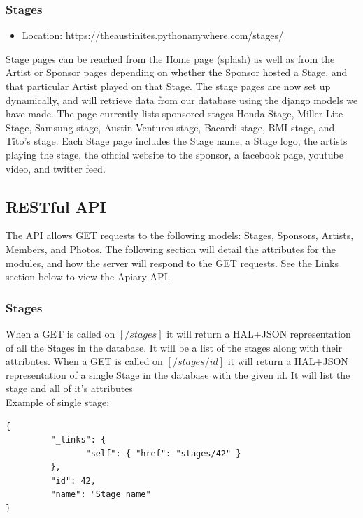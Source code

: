 \documentclass[12pt,english]{scrartcl}
\begin{document}
\subsubsection{Stages}
\begin{itemize}
 \item Location: https://theaustinites.pythonanywhere.com/stages/
\end{itemize}

Stage pages can be reached from the Home page (splash) as well as from the Artist or Sponsor pages depending on whether the Sponsor hosted a
Stage, and that particular Artist played on that Stage. The stage pages are now set up dynamically, and will retrieve data from our database using the django models we have made. The 
page currently lists sponsored stages Honda Stage, Miller Lite Stage, Samsung stage, Austin Ventures stage, Bacardi stage, BMI stage, and Tito's stage. Each Stage page includes the 
Stage name, a Stage logo, the artists playing the stage, the official website to the sponsor, a facebook page, youtube video, and twitter feed.

\subsection{RESTful  API}
The API allows GET requests to the following models: Stages, Sponsors, Artists, Members, and  Photos.
The following section will detail the attributes for the modules, and how the server will respond to the GET requests. See 
the Links section below to view the Apiary API.

\subsubsection{Stages}
When a GET is called on $[/stages]$ it will return a HAL+JSON representation of all the Stages in the database.  It will be a list of the stages along with their attributes.
When a GET is called on $[/stages/{id}]$ it will return a HAL+JSON representation of a single Stage in the database with the given id.  It will list the stage and all of it's attributes
\\							
Example of single stage:
\begin{verbatim}
{
         "_links": {
                "self": { "href": "stages/42" }
         },
         "id": 42,
         "name": "Stage name"
}
\end{verbatim}
\end{document}
